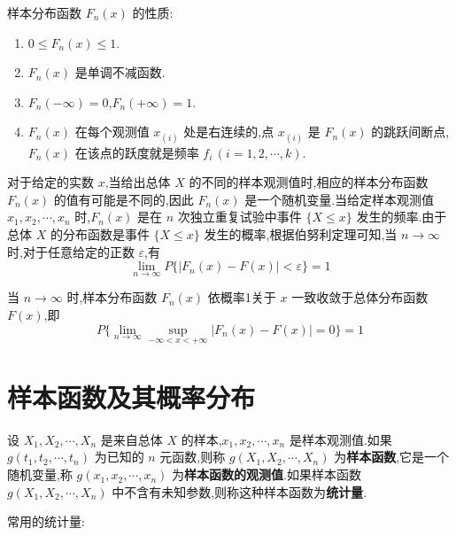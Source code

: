 样本分布函数 $F_n(x)$ 的性质:

\begin{enumerate}
    \item $0 \leqslant F_n(x) \leqslant 1$.
    \item $F_n(x)$ 是单调不减函数.
    \item $F_n(-\infty) = 0$,$F_n(+\infty) = 1$.
    \item $F_n(x)$ 在每个观测值 $x_{(i)}$ 处是右连续的,点 $x_{(i)}$ 是 $F_n(x)$ 的跳跃间断点,$F_n(x)$ 在该点的跃度就是频率 $f_i \, (i=1,2,\cdots,k)$.
\end{enumerate}

对于给定的实数 $x$,当给出总体 $X$ 的不同的样本观测值时,相应的样本分布函数 $F_n(x)$ 的值有可能是不同的,因此 $F_n(x)$ 是一个随机变量.当给定样本观测值 $x_1,x_2,\cdots,x_n$ 时,$F_n(x)$ 是在 $n$ 次独立重复试验中事件 $\{ X \leqslant x \}$ 发生的频率.由于总体 $X$ 的分布函数是事件 $\{ X \leqslant x \}$ 发生的概率,根据伯努利定理可知,当 $n \to \infty$ 时,对于任意给定的正数 $\varepsilon$,有
$$
\lim_{n \to \infty} P \{ |F_n(x) - F(x)| < \varepsilon \} = 1
$$

\begin{theorem}[][格利文科定理]
    当 $n \to \infty$ 时,样本分布函数 $F_n(x)$ 依概率1关于 $x$ 一致收敛于总体分布函数 $F(x)$,即
    $$
    P \{ \lim_{n \to \infty} \sup_{-\infty < x < +\infty} |F_n(x) - F(x)| = 0 \} = 1
    $$
\end{theorem}

\section{样本函数及其概率分布}

\begin{definition}
    设 $X_1,X_2,\cdots,X_n$ 是来自总体 $X$ 的样本,$x_1,x_2,\cdots,x_n$ 是样本观测值.如果 $g(t_1,t_2,\cdots,t_n)$ 为已知的 $n$ 元函数,则称 $g(X_1,X_2,\cdots,X_n)$ 为\textbf{样本函数},它是一个随机变量,称 $g(x_1,x_2,\cdots,x_n)$ 为\textbf{样本函数的观测值}.如果样本函数 $g(X_1,X_2,\cdots,X_n)$ 中不含有未知参数,则称这种样本函数为\textbf{统计量}.
\end{definition}

常用的统计量:

